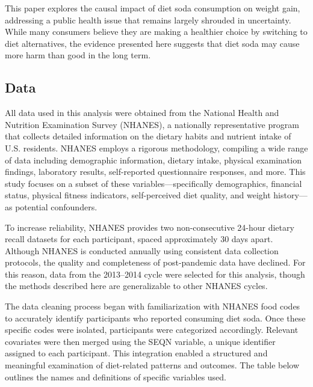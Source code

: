 \documentclass[
  11pt,
]{article}
\begin{document}
This paper explores the causal impact of diet soda consumption on weight
gain, addressing a public health issue that remains largely shrouded in
uncertainty. While many consumers believe they are making a healthier
choice by switching to diet alternatives, the evidence presented here
suggests that diet soda may cause more harm than good in the long term.

\subsection{Data}\label{data}

All data used in this analysis were obtained from the National Health
and Nutrition Examination Survey (NHANES), a nationally representative
program that collects detailed information on the dietary habits and
nutrient intake of U.S. residents. NHANES employs a rigorous
methodology, compiling a wide range of data including demographic
information, dietary intake, physical examination findings, laboratory
results, self-reported questionnaire responses, and more. This study
focuses on a subset of these variables---specifically demographics,
financial status, physical fitness indicators, self-perceived diet
quality, and weight history---as potential confounders.

To increase reliability, NHANES provides two non-consecutive 24-hour
dietary recall datasets for each participant, spaced approximately 30
days apart. Although NHANES is conducted annually using consistent data
collection protocols, the quality and completeness of post-pandemic data
have declined. For this reason, data from the 2013--2014 cycle were
selected for this analysis, though the methods described here are
generalizable to other NHANES cycles.

The data cleaning process began with familiarization with NHANES food
codes to accurately identify participants who reported consuming diet
soda. Once these specific codes were isolated, participants were
categorized accordingly. Relevant covariates were then merged using the
SEQN variable, a unique identifier assigned to each participant. This
integration enabled a structured and meaningful examination of
diet-related patterns and outcomes. The table below outlines the names
and definitions of specific variables used.
\end{document}
